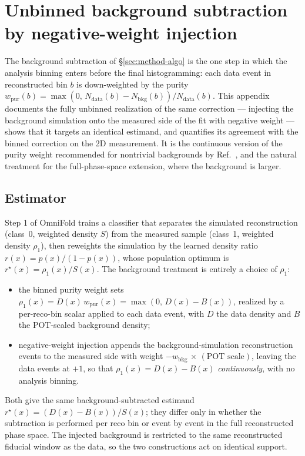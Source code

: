 \section{Unbinned background subtraction by negative-weight injection}
\label{app:negweight}

The background subtraction of \S\ref{sec:method-algo} is the one step in which
the analysis binning enters before the final histogramming: each data event in
reconstructed bin $b$ is down-weighted by the purity
$w_{\mathrm{pur}}(b)=\max(0,\,N_{\mathrm{data}}(b)-N_{\mathrm{bkg}}(b))/
N_{\mathrm{data}}(b)$. This appendix documents the fully unbinned realization of
the same correction --- injecting the background simulation onto the measured
side of the fit with negative weight --- shows that it targets an identical
estimand, and quantifies its agreement with the binned correction on the 2D
measurement. It is the continuous version of the purity weight recommended for
nontrivial backgrounds by Ref.~\cite{unbinnedguide}, and the natural treatment
for the full-phase-space extension, where the background is larger.

\subsection{Estimator}
\label{sec:negweight-estimator}

Step 1 of OmniFold trains a classifier that separates the simulated
reconstruction (class~0, weighted density $S$) from the measured sample
(class~1, weighted density $\rho_1$), then reweights the simulation by the
learned density ratio $r(x)=p(x)/(1-p(x))$, whose population optimum is
$r^{\star}(x)=\rho_1(x)/S(x)$. The background treatment is entirely a choice of
$\rho_1$:
\begin{itemize}
  \item the binned purity weight sets
    $\rho_1(x)=D(x)\,w_{\mathrm{pur}}(x)=\max(0,\,D(x)-B(x))$, realized by a
    per-reco-bin scalar applied to each data event, with $D$ the data density
    and $B$ the POT-scaled background density;
  \item negative-weight injection appends the background-simulation
    reconstruction events to the measured side with weight
    $-w_{\mathrm{bkg}}\,\times\,(\text{POT scale})$, leaving the data events at
    $+1$, so that $\rho_1(x)=D(x)-B(x)$ \emph{continuously}, with no analysis
    binning.
\end{itemize}
Both give the same background-subtracted estimand
$r^{\star}(x)=(D(x)-B(x))/S(x)$; they differ only in whether the subtraction is
performed per reco bin or event by event in the full reconstructed phase space.
The injected background is restricted to the same reconstructed fiducial window
as the data, so the two constructions act on identical support.

